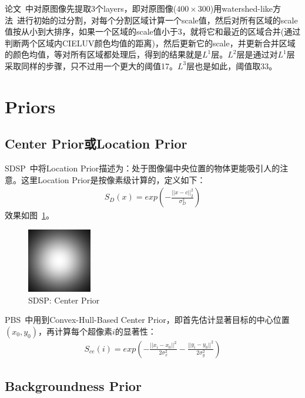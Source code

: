 \documentclass[12pt]{article}
\begin{document}
论文~\cite{yan2013hierarchical}中对原图像先提取3个layers，即对原图像($400 \times 300$)用watershed-like方法~\cite{gonzalez2009digital}进行初始的过分割，对每个分割区域计算一个scale值，然后对所有区域的scale值按从小到大排序，如果一个区域的scale值小于3，就将它和最近的区域合并(通过判断两个区域内CIELUV颜色均值的距离)，然后更新它的scale，并更新合并区域的颜色均值，等对所有区域都处理后，得到的结果就是$L^1$层。$L^2$层是通过对$L^1$层采取同样的步骤，只不过用一个更大的阈值17。$L^3$层也是如此，阈值取33。

\section{Priors}

\subsection{Center Prior或Location Prior}

SDSP~\cite{zhang2013sdsp}中将Location Prior描述为：处于图像偏中央位置的物体更能吸引人的注意。这里Location Prior是按像素级计算的，定义如下：
\begin{align}
S_D(x) = exp\left(-\frac{||x-c||_2^2}{\sigma_D^2}\right)
\end{align}
效果如图~\ref{fig: SDSPCenterPrior}。
\begin{figure}[!ht]
\centering
\includegraphics[width=0.25\textwidth]{SDSPCenterPrior.png}
\caption{SDSP: Center Prior}
\label{fig: SDSPCenterPrior}
\end{figure} 

PBS~\cite{yang2013graph}中用到Convex-Hull-Based Center Prior，即首先估计显著目标的中心位置$(x_0, y_0)$，再计算每个超像素$i$的显著性：
\begin{align}
S_{ce}(i) = exp\left(-\frac{||x_i-x_0||^2}{2\sigma_x^2}-\frac{||y_i-y_0||^2}{2\sigma_y^2}\right)
\end{align}

\subsection{Backgroundness Prior}
\end{document}
